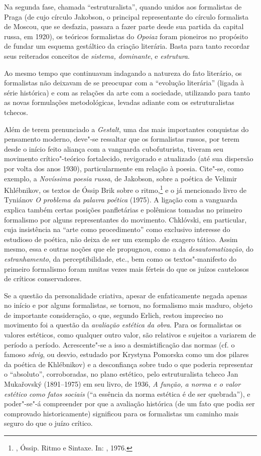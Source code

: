 Na segunda fase, chamada ``estruturalista'', quando unidos aos
formalistas de Praga (de cujo círculo Jakobson, o principal
representante do círculo formalista de Moscou, que se desfazia,
passara a fazer parte desde sua partida da capital russa, em 1920), os
teóricos formalistas do \emph{Opoiaz} foram pioneiros no propósito de
fundar um esquema gestáltico da criação literária. Basta para tanto
recordar seus reiterados conceitos de \emph{sistema, dominante}, e
\emph{estrutura}.

Ao mesmo tempo que continuavam indagando a natureza do fato literário,
os formalistas não deixavam de se preocupar com a ``evolução literária''
 (ligada à série histórica) e com as relações da arte com a sociedade, utilizando para
tanto as novas formulações metodológicas, levadas
adiante com os estruturalistas tchecos.

Além de terem prenunciado a \emph{Gestalt}, uma das
mais importantes conquistas do pensamento moderno, deve"-se ressaltar que
os formalistas russos, por terem desde o início feito aliança com a
vanguarda cubofuturista, tiveram seu movimento crítico"-teórico
fortalecido, revigorado e atualizado (até sua dispersão por volta dos
anos 1930), particularmente em relação à poesia. Cite"-se, como exemplo, a
\emph{Novíssima poesia russa}, de Jakobson, sobre a poética de Velimir
Khlébnikov, os textos de Óssip Brik sobre o ritmo,\footnote{, Óssip. Ritmo e Sintaxe. In: 
, 1976.} e o já mencionado
livro de Tyniánov \emph{O problema da palavra poética} (1975). A ligação com a
vanguarda explica também certas posições panfletárias e polêmicas
tomadas no primeiro formalismo por alguns representantes do movimento.
Chklóvski, em particular, cuja insistência na ``arte como
procedimento'' como exclusivo interesse do estudioso de
poética, não deixa de ser um exemplo de exagero tático. Assim mesmo, essa e outras noções que ele propugnou, como a
da \emph{desautomatização}, do \emph{estranhamento}, da perceptibilidade, etc., bem
como os textos"-manifesto do primeiro formalismo foram muitas vezes mais
férteis do que os juízos cautelosos de críticos conservadores.

Se a questão da personalidade criativa, apesar de enfaticamente negada apenas no início e por
alguns formalistas, se tornou, no formalismo mais
maduro, objeto de importante consideração, o que, segundo Erlich, restou impreciso no movimento foi a questão da
\emph{avaliação estética da obra}. Para os formalistas os valores
estéticos, como qualquer outro valor, são relativos e sujeitos a
variarem de período a período. Acrescente"-se a isso a desmistificação das
normas (cf. o famoso \emph{sdvig}, ou desvio, estudado por Krystyna
Pomorska como um dos pilares da poética de Khlébnikov) e a desconfiança
sobre tudo o que poderia representar o ``absoluto'', corroboradas,
no plano estético, pelo estruturalista tcheco Jan
Mukařovský (1891--1975) em seu livro, de 1936, \emph{A função, a norma e o valor
estético como fatos sociais} (``a essência da norma estética é de ser
quebrada''), e poder"-se"-á compreender por que a avaliação histórica (de
um fato que podia ser comprovado historicamente) significou para os
formalistas um caminho mais seguro do que o juízo crítico.

